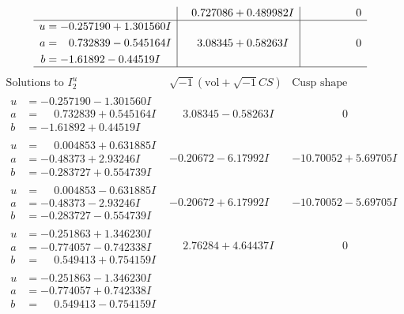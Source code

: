 \documentclass[1p]{elsarticle_modified}
\theoremstyle{definition}
\newcommand{\I}{\sqrt{-1}}
\begin{document}
$$\begin{array}{c|c|c}
 & \phantom{-}0.727086 + 0.489982 I & \phantom{-0.000000 } 0 \\ \hline\begin{aligned}
u &= -0.257190 + 1.301560 I \\
a &= \phantom{-}0.732839 - 0.545164 I \\
b &= -1.61892 - 0.44519 I\end{aligned}
 & \phantom{-}3.08345 + 0.58263 I & \phantom{-0.000000 } 0\\
 \hline 
 \end{array}$$\newpage$$\begin{array}{c|c|c}  
\text{Solutions to }I^u_{2}& \I (\text{vol} + \sqrt{-1}CS) & \text{Cusp shape}\\
 \hline 
\begin{aligned}
u &= -0.257190 - 1.301560 I \\
a &= \phantom{-}0.732839 + 0.545164 I \\
b &= -1.61892 + 0.44519 I\end{aligned}
 & \phantom{-}3.08345 - 0.58263 I & \phantom{-0.000000 } 0 \\ \hline\begin{aligned}
u &= \phantom{-}0.004853 + 0.631885 I \\
a &= -0.48373 + 2.93246 I \\
b &= -0.283727 + 0.554739 I\end{aligned}
 & -0.20672 - 6.17992 I & -10.70052 + 5.69705 I \\ \hline\begin{aligned}
u &= \phantom{-}0.004853 - 0.631885 I \\
a &= -0.48373 - 2.93246 I \\
b &= -0.283727 - 0.554739 I\end{aligned}
 & -0.20672 + 6.17992 I & -10.70052 - 5.69705 I \\ \hline\begin{aligned}
u &= -0.251863 + 1.346230 I \\
a &= -0.774057 - 0.742338 I \\
b &= \phantom{-}0.549413 + 0.754159 I\end{aligned}
 & \phantom{-}2.76284 + 4.64437 I & \phantom{-0.000000 } 0 \\ \hline\begin{aligned}
u &= -0.251863 - 1.346230 I \\
a &= -0.774057 + 0.742338 I \\
b &= \phantom{-}0.549413 - 0.754159 I\end{aligned}

\end{array}$$
\end{document}
